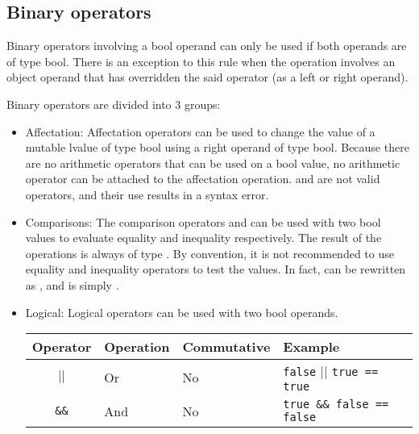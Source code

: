 \subsection{Binary operators}
\label{sec:org030ae50}

Binary operators involving a bool operand can only be used if both operands are
of type bool. There is an exception to this rule when the operation involves an
object operand that has overridden the said operator (as a left or right
operand).

Binary operators are divided into 3 groups:

\begin{itemize}
\item Affectation: Affectation operators can be used to change the value of a
  mutable lvalue of type bool using a right operand of type bool. Because there
  are no arithmetic operators that can be used on a bool value, no arithmetic
  operator can be attached to the affectation operation. \token{\&\&=} and
  \token{||=} are not valid operators, and their use results in a syntax error.

\item Comparisons: The comparison operators \token{==} and \token{!=} can be
  used with two bool values to evaluate equality and inequality respectively.
  The result of the operations is always of type . By convention,
  it is not recommended to use equality and inequality operators to test the
   values. In fact,  can be rewritten as
  , and  is simply .

\item Logical: Logical operators can be used with two bool operands.

  \begin{center}
    \vspace{-20pt}
    \begin{adjustbox}{max width=1.0\linewidth}
      \begin{tabular}{|c|l l l|}
        \hline
        Operator & Operation & Commutative & Example\\[0pt]
        \hline
        \hline
        \texttt{\(\vert\vert\)} & Or & No & \texttt{false} \(\vert{} \vert{}\) \texttt{true == true}\\[0pt]
        \texttt{\&\&} & And & No & \texttt{true \&\& false == false}\\[0pt]
        \hline
      \end{tabular}
    \end{adjustbox}
  \end{center}


\end{itemize}
